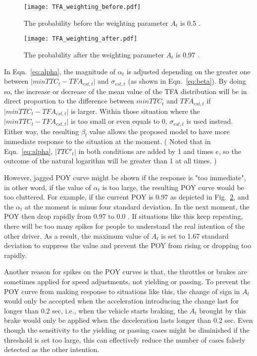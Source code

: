 \begin{figure}[htbp!]
\begin{center}
\texttt{[image: TFA\_weighting\_before.pdf]}
\end{center}
\caption{The probability before the weighting parameter $A_t$ is 0.5 .}
\label{fig:TFA_weighting_before} 
\end{figure}

\begin{figure}[htbp!]
\begin{center}
\texttt{[image: TFA\_weighting\_after.pdf]}
\end{center}
\caption{The probability after the weighting parameter $A_t$ is 0.97 .}
\label{fig:TFA_weighting_after} 
\end{figure}

In Eqn.~\ref{eq:alpha}, the magnitude of $\alpha_t$ is adjusted depending on the greater one between $\lvert {min TTC}_{t} - TFA_{est, t} \rvert $ and $ \sigma_{est, t}$ (as shown in Eqn.~\ref{eq:beta}). By doing so, the increase or decrease of the mean value of the TFA distribution will be in direct proportion to the difference between ${min TTC}_{t}$ and $TFA_{est, t}$ if $\lvert {min TTC}_{t} - TFA_{est, t} \rvert $ is larger. Within those situation where the $\lvert {min TTC}_{t} - TFA_{est, t} \rvert $ is too small or even equals to 0, $ \sigma_{est, t}$ is used instead. Either way, the resulting $\beta_{t}$ value allows the proposed model to have more immediate response to the situation at the moment. ( Noted that in Eqn.~\ref{eq:alpha}, $\lvert {TTC'}_{t} \rvert$ in both conditions are added by 1 and times $e$, so the outcome of the natural logarithm will be greater than 1 at all times. )

However, jagged POY curve might be shown if the response is "too immediate", in other word, if the value of $\alpha_t$ is too large, the resulting POY curve would be too cluttered. For example, if the current POY is 0.97 as depicted in Fig.~\ref{fig:TFA_weighting_after}, and the $\alpha_t$ at the moment is minus four standard deviation. In the next moment, the POY then drop rapidly from 0.97 to 0.0 . If situations like this keep repeating, there will be too many spikes for people to understand the real intention of the other driver. As a result, the maximum value of $A_t$ is set to 1.67 standard deviation to suppress the value and prevent the POY from rising or dropping too rapidly.  

Another reason for spikes on the POY curves is that, the throttles or brakes are sometimes applied for speed adjustments, not yielding or passing. To prevent the POY curve from making response to situations like this, the change of sign in $A_t$ would only be accepted when the acceleration introducing the change last for longer than 0.2 sec, i.e., when the vehicle starts braking, the $A_t$ brought by this brake would only be applied when the deceleration lasts longer than 0.2 sec. Even though the sensitivity to the yielding or passing cases might be diminished if the threshold is set too large, this can effectively reduce the number of cases falsely detected as the other intention. 

